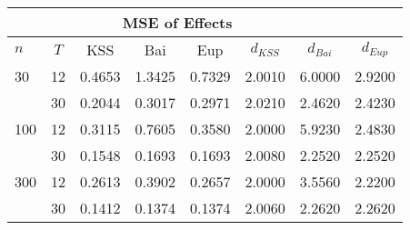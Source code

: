 \begin{tabular}{lccccccc} 
\hline \multicolumn{7}{c}{MSE of Effects} \\ \hline 
$n$ & $T$ & KSS & Bai & Eup & $d_{KSS}$ & $d_{Bai}$ & $d_{Eup}$ \\
\hline
30 & 12 &  0.4653  &  1.3425  &  0.7329  &  2.0010  &  6.0000  &  2.9200  \\
& 30 &  0.2044  &  0.3017  &  0.2971  &  2.0210  &  2.4620  &  2.4230  \\
100 & 12 &  0.3115  &  0.7605  &  0.3580  &  2.0000  &  5.9230  &  2.4830  \\
& 30 &  0.1548  &  0.1693  &  0.1693  &  2.0080  &  2.2520  &  2.2520  \\
300 & 12 &  0.2613  &  0.3902  &  0.2657  &  2.0000  &  3.5560  &  2.2200  \\
& 30 &  0.1412  &  0.1374  &  0.1374  &  2.0060  &  2.2620  &  2.2620  \\
\end{tabular} 
